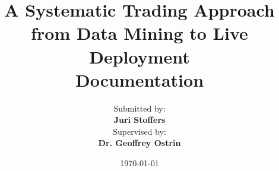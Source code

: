 \documentclass[12pt]{article}
\title{\Huge A Systematic Trading Approach from Data Mining to Live Deployment\\\vspace{1cm}\Large Documentation}
\author{\Large Submitted by:\\\vspace{0.5cm}\textbf{Juri Stoffers}\\\vspace{2cm}\Large Supervised by:\\\vspace{0.5cm}\textbf{Dr. Geoffrey Ostrin}}
\date{\Large \today}
\begin{document}
\begin{titlepage}
\maketitle
\end{titlepage}

\newpage
{}
\end{document}
